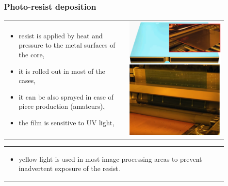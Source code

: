 \documentclass{beamer}
\begin{document}
	\begin{frame}
    \frametitle{Photo-resist deposition}

		\begin{flushleft}
			\begin{tabular}{m{0.5\linewidth} m{0.4\linewidth}}
			\begin{itemize}
				\item resist is applied by heat and pressure to the metal surfaces of the core,
				\item it is rolled out in most of the cases,
				\item it can be also sprayed in case of piece production (amateurs),
				\item the film is sensitive to UV light,
			\end{itemize}
			 & \includegraphics[scale=0.12]{obr05_jadroFotofilm.png}
			\end{tabular}
			\begin{tabular}{m{0.9\linewidth}}
			\begin{itemize}
				\item yellow light is used in most image processing areas to prevent inadvertent exposure of the resist.
			\end{itemize}
			\end{tabular}
		\end{flushleft}

	\end{frame}
\end{document}
